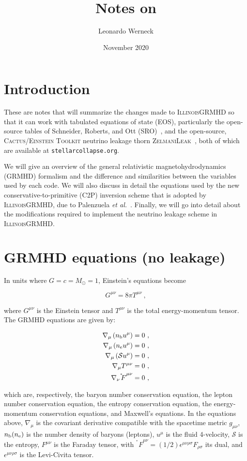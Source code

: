 \documentclass{article}
\title{Notes on \igm}
\author{Leonardo Werneck}
\date{November 2020}
\newcommand{\igm}{\textsc{IllinoisGRMHD}\xspace}
\newcommand{\zl}{\textsc{ZelmaniLeak}\xspace}
\newcommand{\cactus}{\textsc{Cactus}\xspace}
\newcommand{\etk}{\textsc{Einstein Toolkit}\xspace}
\newcommand{\stellarcollapse}{\texttt{stellarcollapse.org}\xspace}
\newcommand{\etal}{\textit{et al.}\xspace}
\newcommand{\dF}{{^{^*}\!\!F}}
\newcommand{\ent}{\mathcal{S}}
\renewcommand{\ne}{n_{\rm e}}
\newcommand{\nb}{n_{\rm b}}
\newcommand{\palenzuela}{\cite{palenzuela2015effects}\xspace}
\newcommand{\eq}[1]{
\begin{equation}
    #1
\end{equation}
}
\newcommand{\al}[1] {
\begin{align}
    #1
\end{align}
}
\begin{document}
\maketitle

\tableofcontents

\section{Introduction}

These are notes that will summarize the changes made to \igm so that it can work with tabulated equations of state (EOS), particularly the open-source tables of Schneider, Roberts, and Ott (SRO)~\cite{schneider2017open}, and the open-source, \cactus/\etk neutrino leakage thorn \zl~\cite{2012PhRvD..86b4026O,2013ApJ...768..115O}, both of which are available at \stellarcollapse.

We will give an overview of the general relativistic magnetohydrodynamics (GRMHD) formalism and the difference and similarities between the variables used by each code. We will also discuss in detail the equations used by the new conservative-to-primitive (C2P) inversion scheme that is adopted by \igm, due to Palenzuela \etal~\palenzuela. Finally, we will go into detail about the modifications required to implement the neutrino leakage scheme in \igm.

\section{GRMHD equations (no leakage)}

In units where $G = c = M_{\odot} = 1$, Einstein's equations become

\eq{ G^{\mu\nu} = 8\pi T^{\mu\nu}\ ,\label{eq:EinsteinsEqs} }

\noindent where $G^{\mu\nu}$ is the Einstein tensor and $T^{\mu\nu}$ is the total energy-momentum tensor. The GRMHD equations are given by:

\al{
\nabla_{\mu}\left(\nb u^{\mu}\right) &= 0\ ,\label{eq:ConsBaryonNumber}\\
\nabla_{\mu}\left(\ne u^{\mu}\right) &= 0\ ,\label{eq:ConsLeptonNumber}\\
\nabla_{\mu}\left(\ent u^{\mu}\right)   &= 0\ ,\label{eq:ConsEntropy}\\
\nabla_{\mu}T^{\mu\nu} &= 0\ ,\label{eq:ConsEM}\\
\nabla_{\nu}\dF^{\mu\nu} &= 0\ ,\label{eq:MaxwellsEqs}
}

\noindent which are, respectively, the baryon number conservation equation, the lepton number conservation equation, the entropy conservation equation, the energy-momentum conservation equations, and Maxwell's equations. In the equations above, $\nabla_{\mu}$ is the covariant derivative compatible with the spacetime metric $g_{\mu\nu}$, $\nb (\ne)$ is the  number density of baryons (leptons), $u^{\mu}$ is the fluid 4-velocity, $\ent$ is the entropy, $F^{\mu\nu}$ is the Faraday tensor, with $\dF^{\mu\nu} = (1/2)\epsilon^{\mu\nu\rho\sigma}F_{\rho\sigma}$ its dual, and $\epsilon^{\mu\nu\rho\sigma}$ is the Levi-Civita tensor.
\end{document}
